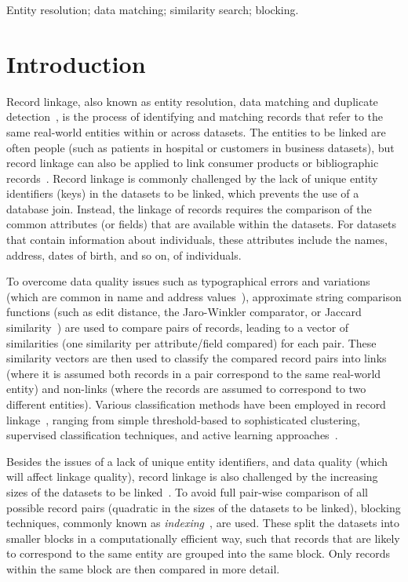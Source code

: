 \documentclass{llncs}
\begin{document}
\keywords Entity resolution; data matching; similarity search;
         blocking.


\section{Introduction}
\label{sec-intro}

Record linkage, also known as entity resolution, data matching and
duplicate detection~\cite{Chr12}, is the process of identifying and
matching records that refer to the same real-world entities within or
across datasets. The entities to be linked are often people (such as
patients in hospital or customers in business datasets), but record
linkage can also be applied to link consumer products or bibliographic
records~\cite{Chr12}. Record linkage is commonly challenged by the lack
of unique entity identifiers (keys) in the datasets to be linked, which
prevents the use of a database join. Instead, the linkage of records
requires the comparison of the common attributes (or fields) that are
available within the datasets. For datasets that contain information
about individuals, these attributes include the names, address, dates of
birth, and so on, of individuals.

To overcome data quality issues such as typographical errors and
variations (which are common in name and address values~\cite{Chr12}),
approximate string comparison functions (such as edit distance, the
Jaro-Winkler comparator, or Jaccard similarity~\cite{Chr12}) are used to
compare pairs of records, leading to a vector of similarities (one
similarity per attribute/field compared) for each pair. These similarity
vectors are then used to classify the compared record pairs into links
(where it is assumed both records in a pair correspond to the same
real-world entity) and non-links (where the records are assumed to
correspond to two different entities). Various classification methods
have been employed in record linkage~\cite{Chr12,Don15}, ranging from
simple threshold-based to sophisticated clustering, supervised
classification techniques, and active learning approaches~\cite{Wan15}.

Besides the issues of a lack of unique entity identifiers, and data
quality (which will affect linkage quality), record linkage is also
challenged by the increasing sizes of the datasets to be
linked~\cite{Don15}. To avoid full pair-wise comparison of all possible
record pairs (quadratic in the sizes of the datasets to be linked),
blocking techniques, commonly known as \emph{indexing}~\cite{Chr12b},
are used. These split the datasets into smaller blocks in a
computationally efficient way, such that records that are likely to
correspond to the same entity are grouped into the same block. Only
records within the same block are then compared in more detail.
\end{document}
